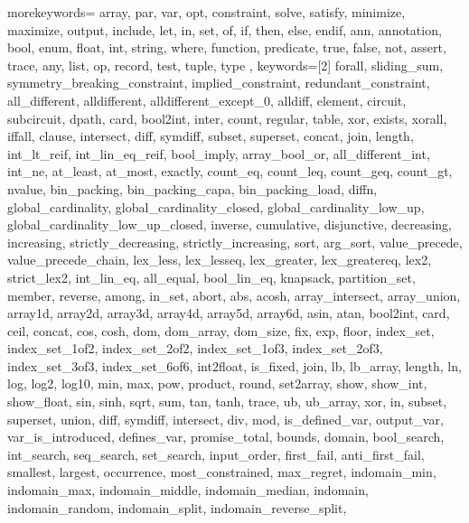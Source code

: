 \usepackage{listings}
\usepackage{courier} %

\newcommand\mznfont{\fontfamily{pcr}\selectfont}

{
  morekeywords={
  array, par, var, opt, constraint, solve, satisfy, minimize,
  maximize, output, include, let, in, set, of, if, then, else, endif,
  ann, annotation, bool, enum, float, int, string, where, function,
  predicate, true, false, not, assert, trace,
  any, list, op, record, test, tuple, type
  },
  keywords=[2]{
  forall, sliding_sum, symmetry_breaking_constraint,
  implied_constraint, redundant_constraint, all_different,
  alldifferent, alldifferent_except_0, alldiff, element, circuit,
  subcircuit, dpath, card, bool2int, inter, count, regular, table, xor,
  exists, xorall, iffall, clause, intersect, diff, symdiff, subset,
  superset, concat, join, length, int_lt_reif, int_lin_eq_reif,
  bool_imply, array_bool_or, all_different_int, int_ne, at_least,
  at_most, exactly, count_eq, count_leq, count_geq, count_gt, nvalue,
  bin_packing, bin_packing_capa, bin_packing_load, diffn,
  global_cardinality, global_cardinality_closed,
  global_cardinality_low_up, global_cardinality_low_up_closed,
  inverse, cumulative, disjunctive, decreasing, increasing,
  strictly_decreasing, strictly_increasing, sort,
  arg_sort, value_precede, value_precede_chain, lex_less, lex_lesseq,
  lex_greater, lex_greatereq, lex2, strict_lex2, int_lin_eq, all_equal,
  bool_lin_eq, knapsack, partition_set, member, reverse, among, in_set,
  abort, abs, acosh, array_intersect, array_union, array1d, array2d,
  array3d, array4d, array5d, array6d, asin, atan, bool2int, card,
  ceil, concat, cos, cosh, dom, dom_array, dom_size, fix, exp, floor,
  index_set, index_set_1of2, index_set_2of2, index_set_1of3,
  index_set_2of3, index_set_3of3, index_set_6of6, int2float, is_fixed,
  join, lb, lb_array, length, ln, log, log2, log10, min, max, pow,
  product, round, set2array, show, show_int, show_float, sin, sinh,
  sqrt, sum, tan, tanh, trace, ub, ub_array, xor, in, subset,
  superset, union, diff, symdiff, intersect, div, mod,
  is_defined_var, output_var, var_is_introduced, defines_var,
  promise_total, bounds, domain, bool_search, int_search, seq_search,
  set_search, input_order, first_fail, anti_first_fail, smallest,
  largest, occurrence, most_constrained, max_regret, indomain_min,
  indomain_max, indomain_middle, indomain_median, indomain,
  indomain_random, indomain_split, indomain_reverse_split,
}}
